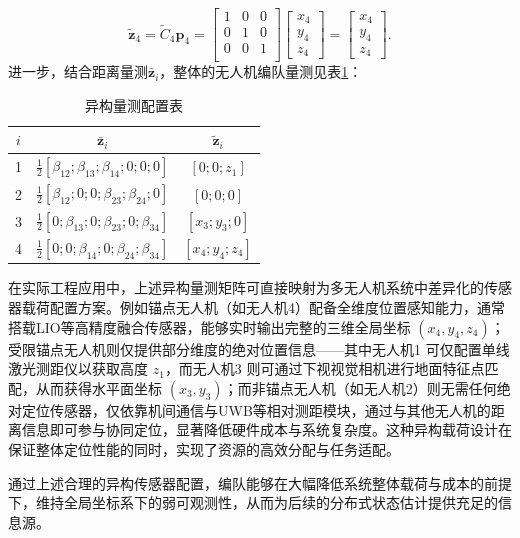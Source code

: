 \begin{equation}
	\tilde{\mathbf{z}}_4 = 
	\tilde{C}_{4}\mathbf{p}_{4} = 
	\begin{bmatrix}
		1&0&0 \\
		0&1&0 \\
		0&0&1 \\
	\end{bmatrix}
	\begin{bmatrix}
		x_4 \\ y_4 \\ z_4
	\end{bmatrix} = 
	\begin{bmatrix}
		x_4 \\ y_4 \\ z_4
	\end{bmatrix}.
\end{equation}
进一步，结合距离量测$\bar{\mathbf{z}}_i$，整体的无人机编队量测见表\ref{异构量测配置表}：

\begin{table}[H]
	\centering
	\caption{异构量测配置表}
	\begin{tabular}{|c|c|c|}
		\hline
		$i$ & $\bar{\mathbf{z}}_i$ & $\tilde{\mathbf{z}}_i$ \\
		\hline
		1 & $\frac{1}{2}[\beta_{12}; \beta_{13};\beta_{14}; 0; 0; 0]$ & $[0; 0; z_1]$ \\
		\hline
		2 & $\frac{1}{2}[\beta_{12}; 0; 0; \beta_{23}; \beta_{24}; 0]$ & $[0; 0; 0]$ \\
		\hline
		3 & $\frac{1}{2}[0; \beta_{13}; 0; \beta_{23}; 0; \beta_{34}]$ & $[x_3; y_3; 0]$ \\
		\hline
		4 & $\frac{1}{2}[0; 0; \beta_{14}; 0; \beta_{24}; \beta_{34}]$ & $[x_4;y_4;z_4]$ \\
		\hline
	\end{tabular}
	\label{异构量测配置表}
\end{table}

在实际工程应用中，上述异构量测矩阵可直接映射为多无人机系统中差异化的传感器载荷配置方案。例如锚点无人机（如无人机4）配备全维度位置感知能力，通常搭载LIO等高精度融合传感器，能够实时输出完整的三维全局坐标 $(x_4, y_4, z_4)$；受限锚点无人机则仅提供部分维度的绝对位置信息——其中无人机1 可仅配置单线激光测距仪以获取高度 $z_1$，而无人机3 则可通过下视视觉相机进行地面特征点匹配，从而获得水平面坐标 $(x_3,y_3)$；而非锚点无人机（如无人机2）则无需任何绝对定位传感器，仅依靠机间通信与UWB等相对测距模块，通过与其他无人机的距离信息即可参与协同定位，显著降低硬件成本与系统复杂度。这种异构载荷设计在保证整体定位性能的同时，实现了资源的高效分配与任务适配。

通过上述合理的异构传感器配置，编队能够在大幅降低系统整体载荷与成本的前提下，维持全局坐标系下的弱可观测性，从而为后续的分布式状态估计提供充足的信息源。
